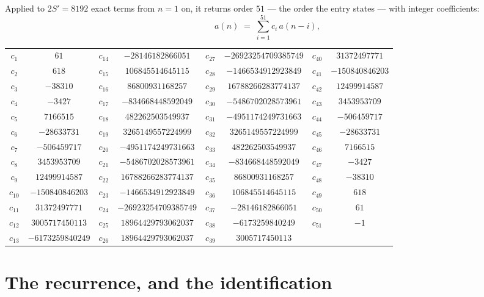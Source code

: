 \documentclass[11pt,a4paper]{article}
\theoremstyle{plain}
\theoremstyle{definition}
\begin{document}
Applied to $2S'=8192$ exact terms from $n=1$ on, it returns order $51$ --- the
order the entry states --- with integer coefficients:
\[
a(n)\;=\;\sum_{i=1}^{51}c_i\,a(n-i),
\]
\begin{center}\small
\begin{tabular}{cccccccc}
$c_{1}$ & $61$ & $c_{14}$ & $-28146182866051$ & $c_{27}$ & $-26923254709385749$ & $c_{40}$ & $31372497771$ \\
$c_{2}$ & $618$ & $c_{15}$ & $106845514645115$ & $c_{28}$ & $-1466534912923849$ & $c_{41}$ & $-150840846203$ \\
$c_{3}$ & $-38310$ & $c_{16}$ & $86800931168257$ & $c_{29}$ & $16788266283774137$ & $c_{42}$ & $12499914587$ \\
$c_{4}$ & $-3427$ & $c_{17}$ & $-834668448592049$ & $c_{30}$ & $-5486702028573961$ & $c_{43}$ & $3453953709$ \\
$c_{5}$ & $7166515$ & $c_{18}$ & $482262503549937$ & $c_{31}$ & $-4951174249731663$ & $c_{44}$ & $-506459717$ \\
$c_{6}$ & $-28633731$ & $c_{19}$ & $3265149557224999$ & $c_{32}$ & $3265149557224999$ & $c_{45}$ & $-28633731$ \\
$c_{7}$ & $-506459717$ & $c_{20}$ & $-4951174249731663$ & $c_{33}$ & $482262503549937$ & $c_{46}$ & $7166515$ \\
$c_{8}$ & $3453953709$ & $c_{21}$ & $-5486702028573961$ & $c_{34}$ & $-834668448592049$ & $c_{47}$ & $-3427$ \\
$c_{9}$ & $12499914587$ & $c_{22}$ & $16788266283774137$ & $c_{35}$ & $86800931168257$ & $c_{48}$ & $-38310$ \\
$c_{10}$ & $-150840846203$ & $c_{23}$ & $-1466534912923849$ & $c_{36}$ & $106845514645115$ & $c_{49}$ & $618$ \\
$c_{11}$ & $31372497771$ & $c_{24}$ & $-26923254709385749$ & $c_{37}$ & $-28146182866051$ & $c_{50}$ & $61$ \\
$c_{12}$ & $3005717450113$ & $c_{25}$ & $18964429793062037$ & $c_{38}$ & $-6173259840249$ & $c_{51}$ & $-1$ \\
$c_{13}$ & $-6173259840249$ & $c_{26}$ & $18964429793062037$ & $c_{39}$ & $3005717450113$ &  &  \\
\end{tabular}
\end{center}

\section{The recurrence, and the identification}
\end{document}
